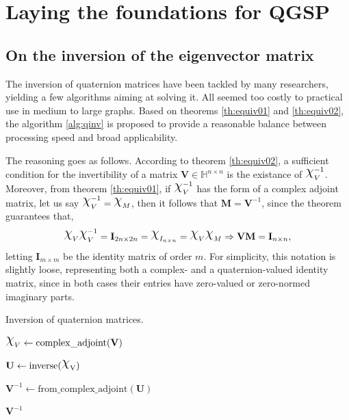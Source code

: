 \section{Laying the foundations for QGSP}

\subsection{On the inversion of the eigenvector matrix}

The inversion of quaternion matrices have been tackled by many researchers, yielding a few algorithms aiming at solving it.  All seemed too costly to practical use in medium to large graphs. Based on theorems \ref{th:equiv01} and \ref{th:equiv02},
the algorithm \ref{alg:qinv} is proposed to provide a reasonable balance between processing speed and broad applicability.

The reasoning goes as follows. According to theorem \ref{th:equiv02}, a sufficient condition for the invertibility of a matrix $\mathbf{V} \in \mathbb{H}^{n \times n}$ is the existance of $\rchi^{-1}_{V}$. Moreover, from theorem \ref{th:equiv01}, if $\rchi^{-1}_{V}$ has the form of a complex adjoint matrix, let us say $\rchi_{V}^{-1} = \rchi_{M}$, then it follows that $\mathbf{M} = \mathbf{V}^{-1}$, since the theorem guarantees that,
\begin{equation}
\rchi_{V} \rchi_{V}^{-1} = \mathbf{I}_{2n \times 2n} = \rchi_{I_{n \times n}} = \rchi_{V} \rchi_{M}
\Rightarrow \mathbf{V} \mathbf{M} = \mathbf{I}_{n \times n},
\end{equation}
letting $\mathbf{I}_{m \times m}$ be the identity matrix of order $m$. For simplicity, this notation is slightly loose, representing both a complex- and a quaternion-valued identity matrix, since in both cases their entries have zero-valued or zero-normed imaginary parts.

\begin{center}
\begin{algorithm}
\caption{Inversion of quaternion matrices.}\label{alg:qinv}
$\rchi_{V} \gets \mathrm{complex\_adjoint(\mathbf{V})}$\;


$\mathbf{U} \gets \mathrm{inverse(\rchi_{V})}$


$\mathbf{V}^{-1} \gets \mathrm{from\_complex\_adjoint}(\mathbf{U})$

\Return $\mathbf{V}^{-1}$
\end{algorithm}
\end{center}

